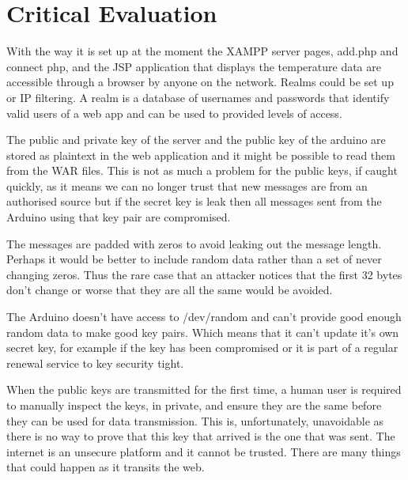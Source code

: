 \chapter{Critical Evaluation}
\label{crit}



With the way it is set up at the moment the XAMPP server pages, add.php and connect php, and the JSP application that displays the temperature data are accessible through a browser by anyone on the network. Realms could be set up or IP filtering. A realm is a database of usernames and passwords that identify valid users of a web app and can be used to provided levels of access.


The public and private key of the server and the public key of the arduino are stored as plaintext in the web application and it might be possible to read them from the WAR files. This is not as much a problem for the public keys, if caught quickly, as it means we can no longer trust that new messages are from an authorised source but if the secret key is leak then all messages sent from the Arduino using that key pair are compromised. 

The messages are padded with zeros to avoid leaking out the message length. Perhaps it would be better to include random data rather than a set of never changing zeros. Thus the rare case that an attacker notices that the first 32 bytes don't change or worse that they are all the same would be avoided.

The Arduino doesn't have access to /dev/random and can't provide good enough random data to make good key pairs. Which means that it can't update it's own secret key, for example if the key has been compromised or it is part of a regular renewal service to key security tight.

When the public keys are transmitted for the first time, a human user is required to manually inspect the keys, in private, and ensure they are the same before they can be used for data transmission. This is, unfortunately, unavoidable as there is no way to prove that this key that arrived is the one that was sent. The internet is an unsecure platform and it cannot be trusted. There are many things that could happen as it transits the web. 


